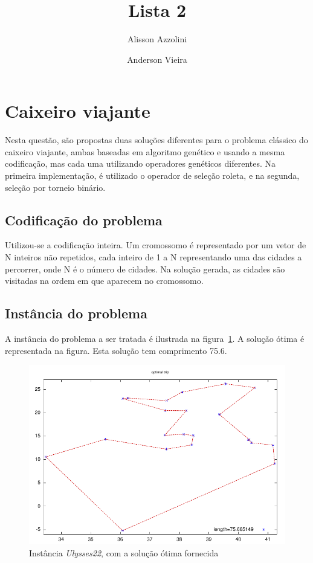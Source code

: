 \documentclass[a4paper]{article}
\title{Lista 2}
\author{Alisson Azzolini \and Anderson Vieira}
\begin{document}
\maketitle

\section{Caixeiro viajante}
Nesta questão, são propostas duas soluções diferentes para o problema clássico do caixeiro viajante, ambas baseadas em algoritmo genético e usando a mesma codificação, mas cada uma utilizando operadores genéticos diferentes. Na primeira implementação, é utilizado o operador de seleção roleta, e na segunda, seleção por torneio binário.

\subsection{Codificação do problema}
Utilizou-se a codificação inteira. Um cromossomo é representado por um vetor de N inteiros não repetidos, cada inteiro de 1 a N representando uma das cidades a percorrer, onde N é o número de cidades. Na solução gerada, as cidades são visitadas na ordem em que aparecem no cromossomo.

\subsection{Instância do problema}

A instância do problema a ser tratada é ilustrada na figura~\ref{fig:otima}. A solução ótima é representada na figura. Esta solução tem comprimento 75.6.

\begin{figure}[h!]
  \centering
%  
  \includegraphics[scale=0.8]{optimal_trip}
  \caption{Instância \textit{Ulysses22}, com a solução ótima fornecida}
  \label{fig:otima}
\end{figure}
\end{document}
